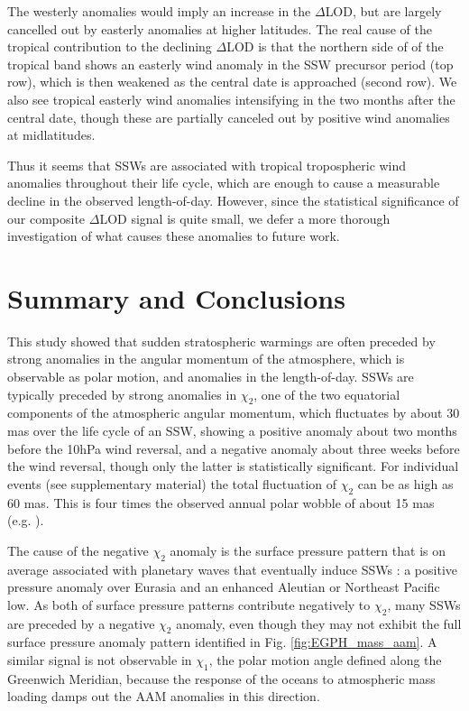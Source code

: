 \documentclass[draft,jgrga]{agutex}
\begin{document}
\begin{article}
 {The westerly anomalies would imply an increase in the $\Delta$LOD, but are largely cancelled out by easterly anomalies at higher latitudes.  
The real cause of the tropical contribution to the declining $\Delta$LOD is that the northern side of of the tropical band shows an easterly wind anomaly in the SSW precursor period (top row), which is then weakened as the central date is approached (second row).
We also see  tropical easterly wind anomalies intensifying in the two months after the central date, though these are partially canceled out by positive wind anomalies at midlatitudes.}

Thus it seems that SSWs are associated with tropical tropospheric wind anomalies throughout their life cycle, which are enough to cause a measurable decline in the observed length-of-day.
However, since the statistical significance of our composite $\Delta$LOD signal is quite small, we defer a more thorough investigation of what causes these anomalies to future work.


\section{Summary and Conclusions}
\label{sec:conclusions}

This study showed that sudden stratospheric warmings  {are often preceded by strong anomalies in the angular momentum of the atmosphere, which is observable as polar motion, and anomalies in the length-of-day.}
SSWs are typically preceded by  strong anomalies in  {$\chi_2$, one of the two equatorial components of the atmospheric angular momentum, which} fluctuates by about 30 mas over the life cycle of an SSW, showing a positive anomaly about two months before the 10hPa wind reversal, and a negative anomaly about three weeks before the wind reversal, though only the latter is statistically significant.  
 {For individual events (see supplementary material)} the total fluctuation of $\chi_2$ can be as high as  60 mas.
This is four times the observed annual polar wobble of about 15 mas (e.g. \cite{dobslawetal2010}).

The cause of the negative $\chi_2$ anomaly  is the  {surface} pressure pattern that is  {on average associated with} planetary waves that eventually induce SSWs \citep{Garfinkel2010, Kodera2013}: a positive pressure anomaly over Eurasia and an enhanced Aleutian  {or Northeast Pacific} low.
 {As both of surface pressure patterns contribute negatively to $\chi_2$, many SSWs are preceded by a negative $\chi_2$ anomaly, even though they may not exhibit the full surface pressure anomaly pattern identified in Fig.} \ref{fig:EGPH_mass_aam}.
A similar signal is not observable in $\chi_1$, the polar motion angle defined along the Greenwich Meridian, because the response of the oceans to atmospheric mass loading damps out the AAM anomalies in this direction.


\end{article}
\end{document}
